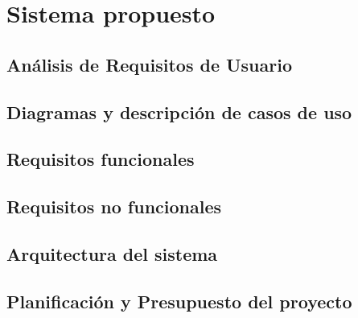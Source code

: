 \section{Sistema propuesto}

\subsection{Análisis de Requisitos de Usuario}

\subsection{Diagramas y descripción de casos de uso}

\subsection{Requisitos funcionales}

\subsection{Requisitos no funcionales}

\subsection{Arquitectura del sistema}

\subsection{Planificación y Presupuesto del proyecto}

\newpage
